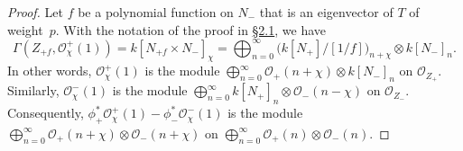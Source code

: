 \documentclass{article}
\theoremstyle{plain}
\theoremstyle{definition}
\newcommand{\scr}[1]{{\mathscr{#1}}}
\begin{document}
\begin{proof}
  Let $f$ be a polynomial function on $N_-$ that is an eigenvector of $T$ of weight~$p$.
  With the notation of the proof in \hyperref[2.1]{\S2.1}, we have
  \[
    \Gamma(Z_{+f},\scr{O}_\chi^+(1))
    = k[N_{+f}\times N_-]_\chi
    = \bigoplus_{n=0}^\infty\big(k[N_+]/[1/f]\big)_{n+\chi}\otimes k[N_-]_n.
  \]
  In other words, $\scr{O}_\chi^+(1)$ is the module $\bigoplus_{n=0}^\infty\scr{O}_+(n+\chi)\otimes k[N_-]_n$ on $\scr{O}_{Z_+}$.
  Similarly, $\scr{O}_\chi^-(1)$ is the module $\bigoplus_{n=0}^\infty k[N_+]_n\otimes\scr{O}_-(n-\chi)$ on $\scr{O}_{Z_-}$.
  Consequently, $\phi_+^*\scr{O}_\chi^+(1)-\phi_-^*\scr{O}_\chi^-(1)$ is the module $\bigoplus_{n=0}^\infty\scr{O}_+(n+\chi)\otimes\scr{O}_-(n+\chi)$ on $\bigoplus_{n=0}^\infty\scr{O}_+(n)\otimes\scr{O}_-(n)$.
\end{proof}







\nocite{*}
\end{document}

